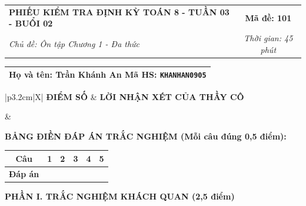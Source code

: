 \documentclass[12pt,a4paper]{article}
\begin{document}
\pagestyle{empty}



\noindent
\begin{tabularx}{\linewidth}{|X|c|}
\hline
\textbf{PHIẾU KIỂM TRA ĐỊNH KỲ TOÁN 8 - TUẦN 03 - BUỔI 02} & \textbf{Mã đề: 101} \\
\textit{Chủ đề: Ôn tập Chương 1 - Đa thức} & \textit{Thời gian: 45 phút} \\
\hline
\end{tabularx}

\vspace{1mm}

\noindent
\begin{tabularx}{\linewidth}{|X|}
\hline
\rule[-2mm]{0pt}{7.5mm}\textbf{Họ và tên:} \textbf{\large Trần Khánh An} \hfill \textbf{Mã HS:} \texttt{KHANHAN0905} \quad \\
\hline
\end{tabularx}

\vspace{1mm}

\noindent
\begin{tabularx}{\linewidth}{|p{3.2cm}|X|}
\hline
\centering\textbf{ĐIỂM SỐ} & \centering\textbf{LỜI NHẬN XÉT CỦA THẦY CÔ} \tabularnewline
\hline
\rule{0pt}{1.3cm} & \tabularnewline
\hline
\end{tabularx}

\vspace{1.2mm}

\noindent\textbf{BẢNG ĐIỀN ĐÁP ÁN TRẮC NGHIỆM (Mỗi câu đúng 0,5 điểm):}
\vspace{0.8mm}

\noindent
\renewcommand{\arraystretch}{1.35}
\begin{tabularx}{\linewidth}{|c|*{5}{>{\centering\arraybackslash}X|}}
\hline
\textbf{Câu} & \textbf{1} & \textbf{2} & \textbf{3} & \textbf{4} & \textbf{5} \\
\hline
\textbf{Đáp án} & & & & & \\
\hline
\end{tabularx}
\renewcommand{\arraystretch}{1.0}

\vspace{1.5mm}

\noindent\textbf{\large PHẦN I. TRẮC NGHIỆM KHÁCH QUAN (2,5 điểm)}
\vspace{1mm}
\end{document}
